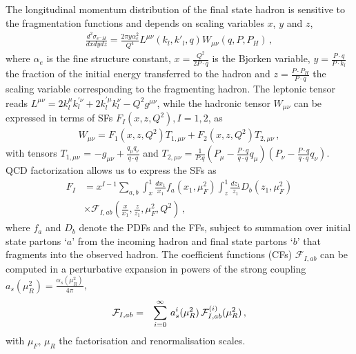 \documentclass[%
 twocolumn,
 superscriptaddress,
 preprintnumbers,
 nofootinbib,
 amsmath,amssymb,
 aps,
 prl,
]{revtex4}
\begin{document}
The longitudinal momentum distribution of the final state hadron is
sensitive to the fragmentation functions and depends on scaling variables $x$, $y$ and $z$,
%
\begin{eqnarray}
\frac{d^2\sigma_{e^{-}H}}{dxdydz} =\frac{2\pi y \alpha_e^{2}}{Q^4}L^{\mu\nu}(k_l,k'_l,q)W_{\mu\nu}(q,P,P_H)
\, ,
\end{eqnarray}
%
where $\alpha_e$ is the fine structure constant, $x=\frac{Q^2}{2 P \cdot q}$ is the Bjorken variable, $y=\frac{P\cdot q}{P\cdot k_l}$ the fraction of the initial energy transferred to the hadron 
and $z= \frac{P \cdot P_H}{P \cdot q}$ the scaling variable corresponding to the fragmenting hadron.
The leptonic tensor reads 
$L^{\mu\nu}=2{k}_l^{\mu}{k}_{l}^{\prime\nu}+2{k}_{l}^{\prime\mu}{k}_l^{\nu} -Q^2 g^{\mu\nu}$, while the hadronic tensor $W_{\mu\nu}$ can be expressed in terms of SFs $F_I(x,z,Q^2), I=1,2$, as
%
\begin{eqnarray}
W_{\mu\nu} = F_1 (x,z,Q^2)T_{1,\mu \nu} + F_2 (x,z,Q^2) T_{2,\mu \nu}
\, ,
\end{eqnarray}
%
with tensors 
$T_{1,\mu\nu}$ = $-g_{\mu \nu}+\frac{q_\mu q_\nu}{q\cdot q}$ 
and 
$T_{2,\mu\nu}= \frac{1}{P.q}(P_\mu - \frac{P\cdot q}{q\cdot q }q_\mu)(P_\nu - \frac{P\cdot q}{q\cdot q} q_\nu)$.
% 
QCD factorization allows us to express the SFs as
%
\begin{align}
\label{eq:SFdef}
F_I &= x^{I-1}\sum_{a,b}\int_x^1 \frac{dx_1}{x_1} f_a(x_1,\mu_F^2) \int_z^1 \frac{dz_1}{z_1} D_b(z_1,\mu_F^2) 
\nonumber \\
    & \times \mathcal{F}_{I,ab}\left( \frac{x}{x_1}, \frac{z}{z_1}, \mu_F^2, Q^2\right )
\, ,
\end{align}
%
where $f_a$ and $D_b$ denote the PDFs and the FFs, subject to summation over initial state partons `$a$' from the incoming hadron and final state partons `$b$' that fragments into the observed hadron. 
The coefficient functions (CFs) $\mathcal{F}_{I,ab}$ can be computed in a perturbative expansion in powers of the strong coupling $a_s(\mu_R^2) = \frac{\alpha_s(\mu_R^2)}{4 \pi}$,
%
\begin{eqnarray}
\label{eq:as-exp}
{\cal F}_{I,ab}&=& \sum_{i=0}^\infty\, a_s^i(\mu_R^2)\, {\cal F}_{I,ab}^{(i)}(\mu_R^2)
\, ,
\end{eqnarray}
%
with $\mu_F$, $\mu_R$ the factorisation and renormalisation scales.
\end{document}
